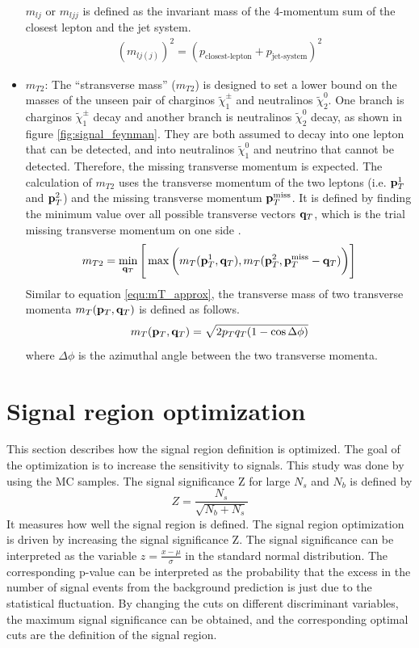 \begin{itemize}
$m_{lj}$ or $m_{ljj}$ is defined as the invariant mass of the 4-momentum sum of the closest lepton and the jet system.
\begin{align}
(m_{lj(j)})^2 = (p_{\text{closest-lepton}} + p_{\text{jet-system}})^2
\end{align}

\item $m_{T2}$:
The ``stransverse mass'' ($m_{T2}$) is designed to set a lower bound on the masses of the unseen pair of charginos $\tilde{\chi}_1^\pm$ and neutralinos $\tilde{\chi}_2^0$.
One branch is charginos $\tilde{\chi}_1^\pm$ decay and another branch is neutralinos $\tilde{\chi}_2^0$ decay, as shown in figure \ref{fig:signal_feynman}.
They are both assumed to decay into one lepton that can be detected, and into neutralinos $\tilde{\chi}_1^0$ and neutrino that cannot be detected.
Therefore, the missing transverse momentum is expected.
The calculation of $m_{T2}$ uses the transverse momentum of the two leptons (i.e. ${\bf p}_T^1$ and ${\bf p}_T^2$) and the missing transverse momentum ${\bf p}_T^{\text{miss}}$.
It is defined by finding the minimum value over all possible transverse vectors ${\bf q}_T$, which is the trial missing transverse momentum on one side \cite{MT2}.
\begin{equation}
m_{T2} = \min_{{\bf q}_T} \Bigg[ \max \bigg( m_T( {\bf p}_T^1, {\bf q}_T ), m_T( {\bf p}_T^2, {\bf p}_T^{\text{miss}} - {\bf q}_T ) \bigg) \Bigg]
\end{equation}
Similar to equation \ref{equ:mT_approx}, the transverse mass of two transverse momenta $m_T( {\bf p}_T, {\bf q}_T )$ is defined as follows.
\begin{equation}
m_T( {\bf p}_T, {\bf q}_T ) = \sqrt{ 2 p_T q_T ( 1 - \cos{\Delta\phi} ) }
\end{equation}
where $\Delta\phi$ is the azimuthal angle between the two transverse momenta.
\end{itemize}

\section{Signal region optimization}
\label{sec:signal_region_optimization}
This section describes how the signal region definition is optimized.
The goal of the optimization is to increase the sensitivity to signals.
This study was done by using the MC samples.
The signal significance Z for large $N_s$ and $N_b$ is defined by
\begin{equation}
Z = \frac{N_s}{\sqrt{N_b + N_s}}
\label{equ:simple_significance}
\end{equation}
It measures how well the signal region is defined.
The signal region optimization is driven by increasing the signal significance Z.
The signal significance can be interpreted as the variable $z = \frac{x-\mu}{\sigma}$ in the standard normal distribution.
The corresponding p-value can be interpreted as the probability that the excess in the number of signal events from the background prediction is just due to the statistical fluctuation.
By changing the cuts on different discriminant variables, the maximum signal significance can be obtained, and the corresponding optimal cuts are the definition of the signal region.

